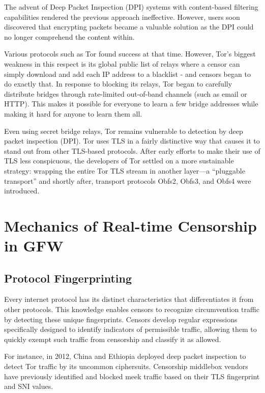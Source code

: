 The advent of Deep Packet Inspection (DPI) systems with content-based filtering capabilities rendered the previous approach ineffective. However, users soon discovered that encrypting packets became a valuable solution as the DPI could no longer comprehend the content within.

Various protocols such as Tor found success at that time. However, Tor’s biggest weakness in this respect is its global public list of relays where a censor can simply download and add each IP address to a blacklist - and censors began to do exactly that. In response to blocking its relays, Tor began to carefully distribute bridges through rate-limited out-of-band channels (such as email or HTTP). This makes it possible for everyone to learn a few bridge addresses while making it hard for anyone to learn them all.

Even using secret bridge relays, Tor remains vulnerable to detection by deep packet inspection (DPI). Tor uses TLS in a fairly distinctive way that causes it to stand out from other TLS-based protocols. After early efforts to make their use of TLS less conspicuous, the developers of Tor settled on a more sustainable strategy: wrapping the entire Tor TLS stream in another layer—a “pluggable transport” and shortly after, transport protocols Obfs2, Obfs3, and Obfs4 were introduced.\cite{ensafi2015firewall}

\section{Mechanics of Real-time Censorship in GFW}

\subsection{Protocol Fingerprinting}
Every internet protocol has its distinct characteristics that differentiates it from other protocols. This knowledge enables censors to recognize circumvention traffic by detecting these unique fingerprints. Censors develop regular expressions specifically designed to identify indicators of permissible traffic, allowing them to quickly exempt such traffic from censorship and classify it as allowed.

For instance, in 2012, China and Ethiopia deployed deep packet inspection to detect Tor traffic by its uncommon ciphersuits. Censorship middlebox vendors have previously identified and blocked meek traffic based on their TLS fingerprint and SNI values.\cite{wu2023great}


